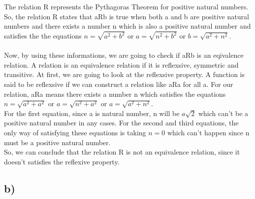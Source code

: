 \documentclass[12pt]{article}
\begin{document}
The relation R represents the Pythagoras Theorem for positive natural numbers. So, the relation R states that aRb is true when both a and b are positive natural numbers and there exists a number n which is also a positive natural number and satisfies the the equations $n = \sqrt{a^2 + b^2}$ or $a = \sqrt{n^2 + b^2}$ or $b = \sqrt{a^2 + n^2}$.\\
\\Now, by using these informations, we are going to check if aRb is an eqivalence relation. A relation is an equivalence relation if it is reflexsive, symmetric and transitive. At first, we are going to look at the reflexsive property. A function is said to be reflexsive if we can construct a relation like aRa for all a. For our relation, aRa means  there exists a number n which satisfies the equations $n = \sqrt{a^2 + a^2}$ or $a = \sqrt{n^2 + a^2}$ or $a = \sqrt{a^2 + n^2}$.\\
For the first equation, since a is natural number, n will be $a\sqrt{2}$ which can't be a positive natural number in any cases.
For the second and third equations, the only way of satisfying these equations is taking $n = 0$ which can't happen since n must be a positive natural number.\\
So, we can conclude that the relation R is not an equivalence relation, since it doesn't satisfies the reflexive property.\\


\subsection*{b) }
\end{document}
